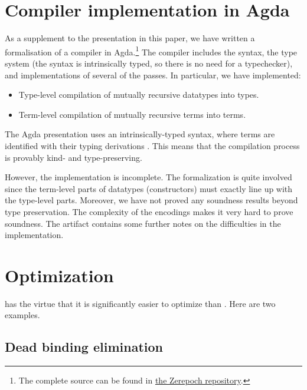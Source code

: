 






\section{Compiler implementation in Agda}
\label{sec:compiler}

As a supplement to the presentation in this paper, we have written a
formalisation of a \FIR{} compiler in Agda.\footnote{The complete source can be found
  in \href{\sourceUrl}{the Zerepoch repository}.}
The compiler includes the syntax, the type
system (the syntax is intrinsically typed, so there is no need for a
typechecker), and implementations of several of the passes. In particular, we
have implemented:
\begin{itemize}
  \item Type-level compilation of mutually recursive datatypes into \FOMF{} types.
  \item Term-level compilation of mutually recursive terms into \FOMF{} terms.
\end{itemize}

\noindent The Agda presentation uses an intrinsically-typed syntax, where
terms are identified with their typing derivations \cite{altenkirch.reus:welltyped}. This means that the
compilation process is provably kind- and type-preserving.

However, the implementation is incomplete. The formalization is quite involved
since the term-level parts of datatypes (constructors) must exactly line up with
the type-level parts. Moreover, we have not proved any soundness results beyond
type preservation. The complexity of the encodings makes it very hard to
prove soundness. The artifact contains some further notes on the difficulties in the implementation.

\section{Optimization}

\FIR{} has the virtue that it is significantly easier to optimize than
\FOMF{}. Here are two examples.

\subsection{Dead binding elimination}

